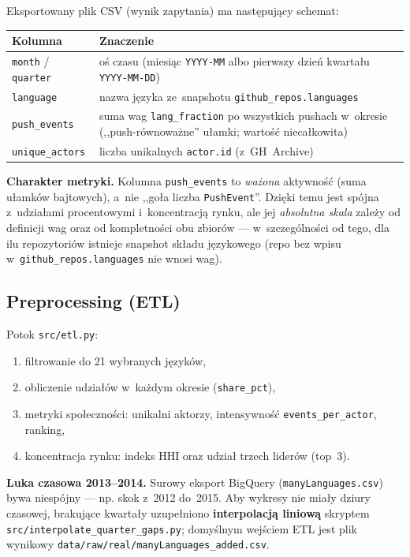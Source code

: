 \documentclass[11pt,a4paper]{article}
\begin{document}
Eksportowany plik CSV (wynik zapytania) ma następujący schemat:

\begin{center}
\begin{tabular}{@{}lp{11cm}@{}}
\toprule
\textbf{Kolumna} & \textbf{Znaczenie} \\
\midrule
\texttt{month} / \texttt{quarter} & oś czasu (miesiąc \texttt{YYYY-MM} albo pierwszy dzień kwartału \texttt{YYYY-MM-DD}) \\
\texttt{language} & nazwa języka ze~snapshotu \texttt{github\_repos.languages} \\
\texttt{push\_events} & suma wag \texttt{lang\_fraction} po wszystkich pushach w~okresie (,,push-równoważne'' ułamki; wartość niecałkowita) \\
\texttt{unique\_actors} & liczba unikalnych \texttt{actor.id} (z~GH~Archive) \\
\bottomrule
\end{tabular}
\end{center}

\textbf{Charakter metryki.} Kolumna \texttt{push\_events} to \emph{ważona} aktywność
(suma ułamków bajtowych), a~nie ,,goła liczba \texttt{PushEvent}''. Dzięki temu jest spójna
z~udziałami procentowymi i~koncentracją rynku, ale jej \emph{absolutna skala} zależy od definicji
wag oraz od kompletności obu zbiorów --- w~szczególności od tego, dla ilu repozytoriów istnieje
snapshot składu językowego (repo bez wpisu w~\texttt{github\_repos.languages} nie wnosi wag).

\subsection{Preprocessing (ETL)}

Potok \texttt{src/etl.py}:
\begin{enumerate}[nosep]
  \item filtrowanie do 21 wybranych języków,
  \item obliczenie udziałów w~każdym okresie (\texttt{share\_pct}),
  \item metryki społeczności: unikalni aktorzy, intensywność \texttt{events\_per\_actor}, ranking,
  \item koncentracja rynku: indeks HHI oraz udział trzech liderów (top~3).
\end{enumerate}

\textbf{Luka czasowa 2013--2014.} Surowy eksport BigQuery (\texttt{manyLanguages.csv}) bywa
niespójny --- np. skok z~2012 do~2015. Aby wykresy nie miały dziury czasowej, brakujące
kwartały uzupełniono \textbf{interpolacją liniową} skryptem
\texttt{src/interpolate\_quarter\_gaps.py}; domyślnym wejściem ETL jest plik wynikowy
\texttt{data/raw/real/manyLanguages\_added.csv}.
\end{document}
